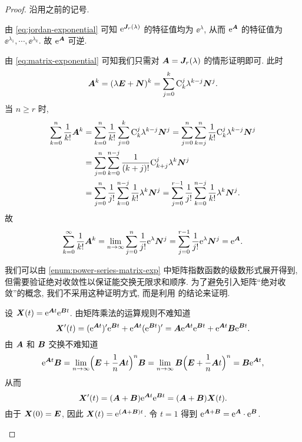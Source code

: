 \begin{proof}
  沿用之前的记号.
  \begin{enuma}
    \item 由 \ref{eq:jordan-exponential} 可知 $\ee^{\bfJ_r(\lambda)}$ 的特征值均为 $\ee^{\lambda}$, 从而 $\ee^\bfA$ 的特征值为 $\ee^{\lambda_1},\cdots,\ee^{\lambda_k}$.
    故 $\ee^\bfA$ 可逆.
    \item 由 \ref{eq:matrix-exponential} 可知我们只需对 $\bfA=\bfJ_r(\lambda)$ 的情形证明即可.
    此时
    \[
       \bfA^k
      =(\lambda\bfE+\bfN)^k
      =\sum_{j=0}^k \rmC_k^j \lambda^{k-j}\bfN^j.
    \]
    当 $n\ge r$ 时, 
    \begin{align*}
       \sum_{k=0}^n \frac1{k!}\bfA^k&
      =\sum_{k=0}^n \frac1{k!}\sum_{j=0}^k \rmC_k^j \lambda^{k-j}\bfN^j
      =\sum_{j=0}^n\sum_{k=j}^n \frac1{k!}\rmC_k^j \lambda^{k-j}\bfN^j\\&
      =\sum_{j=0}^n\sum_{k=0}^{n-j} \frac1{(k+j)!}\rmC_{k+j}^j \lambda^k\bfN^j\\&
      =\sum_{j=0}^n\frac1{j!}\sum_{k=0}^{n-j} \frac1{k!}\lambda^k\bfN^j
      =\sum_{j=0}^{r-1}\frac1{j!}\sum_{k=0}^{n-j} \frac1{k!}\lambda^k\bfN^j.
    \end{align*}
    故
    \[
      \sum_{k=0}^{\infty} \frac1{k!}\bfA^k
      =\lim_{n\ra\infty}\sum_{j=0}^n\frac1{j!}\ee^\lambda\bfN^j
      =\sum_{j=0}^{r-1}\frac1{j!}\ee^\lambda\bfN^j
      =\ee^{\bfA}.  
    \]
    \item 我们可以由 \ref{enum:power-series-matrix-exp} 中矩阵指数函数的级数形式展开得到, 但需要验证绝对收敛性以保证能交换无限求和顺序.
    为了避免引入矩阵``绝对收敛''的概念, 我们不采用这种证明方式, 而是利用 的结论来证明.

    设 $\bfX(t)=\ee^{\bfA t}\ee^{\bfB t}$.
    由矩阵乘法的运算规则不难知道
    \[
       \bfX'(t)
      =(\ee^{\bfA t})'\ee^{\bfB t}+\ee^{\bfA t}(\ee^{\bfB t})'
      =\bfA \ee^{\bfA t}\ee^{\bfB t}+\ee^{\bfA t}\bfB\ee^{\bfB t}.
    \]
    由 $\bfA$ 和 $\bfB$ 交换不难知道
    \[
       \ee^{\bfA t}\bfB
      =\lim_{n\ra \infty}\Bigl(\bfE+\frac1n \bfA t\Bigr)^n\bfB
      =\lim_{n\ra \infty}\bfB\Bigl(\bfE+\frac1n \bfA t\Bigr)^n
      =\bfB\ee^{\bfA t},
    \]
    从而
    \[
        \bfX'(t)
        =(\bfA+\bfB)\ee^{\bfA t}\ee^{\bfB t}
        =(\bfA+\bfB)\bfX(t).
    \]
    由于 $\bfX(0)=\bfE$, 因此 $\bfX(t)=\ee^{(\bfA+\bfB)t}$.
    令 $t=1$ 得到 $\ee^{\bfA+\bfB}=\ee^\bfA\cdot \ee^\bfB$.
    \qedhere
  \end{enuma}
\end{proof}

